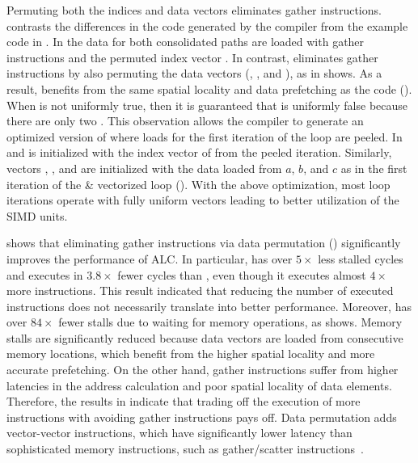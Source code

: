 Permuting both the indices and data vectors eliminates gather instructions.
 contrasts the differences in the code generated by the compiler from the example code in .
In  the data for both consolidated paths are loaded with gather instructions and the permuted index vector \vM.
In contrast, \ALCdp eliminates gather instructions by also permuting  the data vectors (, , and ), as  in  shows.
As a result, \ALCdp benefits from the same spatial locality and data prefetching as the \ifconverted code ().
When \vM is not uniformly true, then it is guaranteed that \vR is uniformly false because there are only two \cpaths.
This observation allows the compiler to generate an optimized version of \iterALC where loads for the first iteration of the loop are peeled.
In  and  \vM is initialized with the index vector of from the peeled iteration.
Similarly, vectors , , and  are initialized with the data loaded from $a$, $b$, and $c$ as in the first iteration of the \ifconverted \& vectorized loop ().
With the above optimization, most loop iterations operate with fully uniform vectors leading to better utilization of the SIMD units.

 shows that eliminating gather instructions via data permutation (\ALCdp) significantly improves the performance of ALC.
In particular, \ALCdp has over $5\times$ less stalled cycles and executes in $3.8\times$ fewer cycles than \ALC, even though it executes almost $4\times$ more instructions.
This result indicated that reducing the number of executed instructions does not necessarily translate into better performance.
Moreover, \ALCdp has over $84\times$ fewer stalls due to waiting for memory operations, as  shows.
Memory stalls are significantly reduced because data vectors are loaded from consecutive memory locations, which benefit from the higher spatial locality and more accurate prefetching.
On the other hand, gather instructions suffer from higher latencies in the address calculation and poor spatial locality of data elements.
Therefore, the results in  indicate that trading off the execution of more instructions with avoiding gather instructions pays off.
Data permutation adds vector-vector instructions, which have significantly lower latency than sophisticated memory instructions, such as gather/scatter instructions~\cite{A64FXmanual}.

